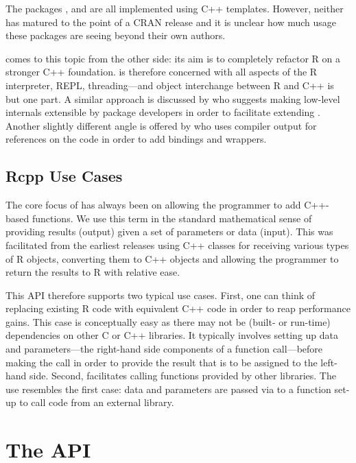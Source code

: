 The packages  \citep{liang08:rcppbind}, 
\citep{armstrong09:RAbstraction} and 
\citep{armstrong09:RObjects} are all implemented using C++ templates.
However, neither has matured to the point of a CRAN release and it is
unclear how much usage these packages are seeing beyond their own authors.

 \citep{runnalls09:cxxr} comes to this topic from the other side: 
its aim is to completely refactor R on a stronger C++ foundation. 
 is therefore concerned with all aspects of the R interpreter,
REPL, threading---and object interchange between R and C++ is but one
part. A similar approach is discussed by \cite{templelang09:modestproposal}
who suggests making low-level internals extensible by package developers in
order to facilitate extending \R.
%
Another slightly different angle is offered by
\cite{templelang09:rgcctranslationunit} who uses compiler output for
references on the code in order to add bindings and wrappers.

\subsection{Rcpp Use Cases} 
\label{sec:classic_rcpp}

The core focus of  has always been on allowing the 
programmer to add C++-based functions. 
We use this term in the standard mathematical sense of providing
results (output) given a set of parameters or data (input). 
This was
facilitated from the earliest releases using C++ classes for receiving
various types of R objects, converting them to C++ objects and allowing the
programmer to return the results to R with relative ease. 

This API therefore supports two typical use cases. First, one can think of
replacing existing R code with equivalent C++ code in order to reap
performance gains.  This case is conceptually easy as there may not be
(built- or run-time) dependencies on other C or C++ libraries.  It typically
involves setting up data and parameters---the right-hand side components of a
function call---before making the call in order to provide the result that is
to be assigned to the left-hand side. Second,  facilitates calling
functions provided by other libraries. The use resembles the first case: data
and parameters are passed via  to a function set-up to call code
from an external library.  

\section{The  API}
\label{sec:new_rcpp}

